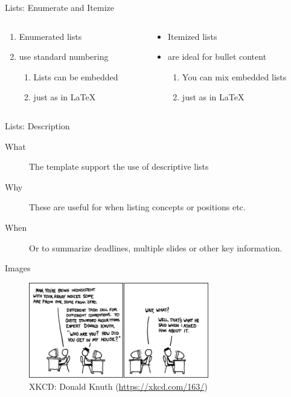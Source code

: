 \documentclass[aspectratio=169]{beamer}
\begin{document}
\begin{frame}{Lists: Enumerate and Itemize}
\begin{columns}
\begin{column}{0.45\textwidth}
    \begin{enumerate}
        \item Enumerated lists
        \item use standard numbering 
        \begin{enumerate}
            \item Lists can be embedded 
            \item just as in \LaTeX
    \end{enumerate}
    \end{enumerate}
\end{column}
\begin{column}{0.45\textwidth}
    \begin{itemize}
        \item Itemized lists
        \item are ideal for bullet content
        \begin{enumerate}
            \item You can mix embedded lists
            \item just as in \LaTeX
        \end{enumerate}
    \end{itemize}
\end{column}
\end{columns}
\end{frame}

\begin{frame}[AUDark]{Lists: Description}
\begin{description}
\item[What] The template support the use of descriptive lists
\item[Why] These are useful for when listing concepts or positions etc.
\item[When] Or to summarize deadlines, multiple slides or other key information.
\end{description}

\end{frame}
\begin{frame}{Images}
\begin{figure}[h]
\centering
\includegraphics[width=0.7\textwidth]{images/donald_knuth.png}
\caption{XKCD: Donald Knuth (\url{https://xkcd.com/163/})}
\end{figure}
\end{frame}
\end{document}
